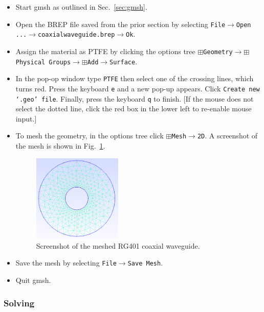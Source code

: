 \documentclass[titlepage]{article}
\renewcommand\_{\textunderscore\linebreak[1]}
\begin{document}
\begin{itemize}
\item Start gmsh as outlined in Sec.~\ref{sec:gmsh}.
\item Open the BREP file saved from the prior section by selecting \newline \texttt{File}$\rightarrow$\texttt{Open ...}$\rightarrow$\texttt{coaxial\_waveguide.brep}$\rightarrow$\texttt{Ok}.
\item Assign the material as PTFE by clicking the options tree \newline$\boxplus$\texttt{Geometry}$\rightarrow$$\boxplus$\texttt{Physical Groups}$\rightarrow$$\boxplus$\texttt{Add}$\rightarrow$\texttt{Surface}.
\item In the pop-op window type \texttt{PTFE} then select one of the crossing lines, which turns red.  Press the keyboard \texttt{e} and a new pop-up appears.  Click \texttt{Create new `.geo' file}.  Finally, press the keyboard \texttt{q} to finish.  [If the mouse does not select the dotted line, click the red box in the lower left to re-enable mouse input.]
\item To mesh the geometry, in the options tree click $\boxplus$\texttt{Mesh}$\rightarrow$\texttt{2D}. A screenshot of the mesh is shown in Fig.~\ref{fig:coaxial_mesh}.
\begin{figure}
  \centering
  \includegraphics[width=0.4\textwidth]{../tutorials/OpenParEM2D/coaxial_waveguide/screenshots/coaxial_mesh}
  \caption{Screenshot of the meshed RG401 coaxial waveguide.}
  \label{fig:coaxial_mesh}
\end{figure}
\item Save the mesh by selecting \texttt{File}$\rightarrow$\texttt{Save Mesh}.
\item Quit gmsh.
\end{itemize}

\subsubsection{Solving}
\end{document}

